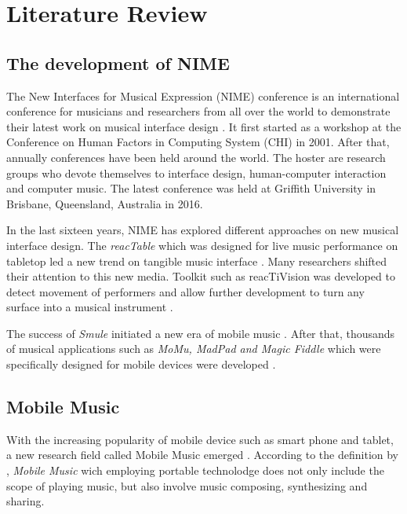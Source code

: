 \pagestyle{fancy}
\rhead{\thepage}
\chapter{Literature Review}
\label{ch: chapter 2}

\section{The development of NIME}
\label{subsec: nime}
The New Interfaces for Musical Expression (NIME) conference is an international conference for musicians and researchers from all over the world to demonstrate their latest work on musical interface design \citep{Reference15}. It first started as a workshop at the Conference on Human Factors in Computing System (CHI) in 2001. After that, annually conferences have been held around the world. The hoster are research groups who devote themselves to interface design, human-computer interaction and computer music. The latest conference was held at Griffith University in Brisbane, Queensland, Australia in 2016.

In the last sixteen years, NIME has explored different approaches on new musical interface design. The \textit{reacTable} which was designed for live music performance on tabletop led a new trend on tangible music interface \citep{Reference17}. Many researchers shifted their attention to this new media. Toolkit such as reacTiVision was developed to detect movement of performers and allow further development to turn any surface into a musical instrument \citep{Reference18}.

The success of \textit{Smule} initiated a new era of mobile music \citep{Reference8}. After that, thousands of musical applications such as \textit{MoMu, MadPad and Magic Fiddle} which were specifically designed for mobile devices were developed \citep{Reference8.2,Reference8.3,Reference8.4}.


\section{Mobile Music}

With the increasing popularity of mobile device such as smart phone and tablet, a new research field called Mobile Music emerged \citep{Reference4}. According to the definition by \citeauthor{Reference6}, \textit{Mobile Music} wich employing portable technolodge does not only include the scope of playing music, but also involve music composing, synthesizing and sharing\citep{Reference6}.

